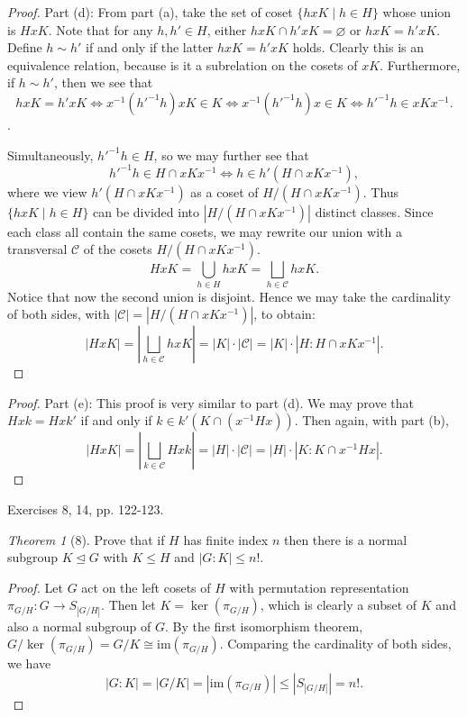 \documentclass[12pt]{article}
\theoremstyle{remark}
\theoremstyle{named}
\newtheorem*{theorem}{Theorem}
\newcommand{\normal}{\trianglelefteq}
\begin{document}
\begin{proof}
    Part (d): From part (a), take the set of coset \(\{hxK \mid h \in H\}\) whose union is \(HxK\). Note that for any \(h, h' \in H\), either \(hxK \cap h'xK = \varnothing\) or \(hxK = h'xK\). Define \(h \sim h'\) if and only if the latter \(hxK = h'xK\) holds. 
    Clearly this is an equivalence relation, because is it a subrelation on the cosets of \(xK\). Furthermore, if \(h \sim h'\), then we see that \[hxK = h'xK \iff x^{-1}(h'^{-1}h)x K \in K \iff x^{-1}(h'^{-1}h)x \in K \iff h'^{-1}h \in xKx^{-1}.\].

    Simultaneously, \(h'^{-1}h \in H\), so we may further see that \[h'^{-1}h \in H \cap xKx^{-1} \iff h \in h'(H \cap xKx^{-1}),\]
    where we view \(h'(H \cap xKx^{-1})\) as a coset of \(H / (H \cap xKx^{-1})\). Thus \(\{hxK \mid h \in H\}\) can be divided into \(|H / (H \cap xKx^{-1})|\) distinct classes. Since each class all contain the same cosets, we may rewrite our union with a transversal \(\mathcal C\) of the cosets \(H / (H \cap xKx^{-1})\).
    \[HxK = \bigcup_{h \in H} hxK = \bigsqcup_{h \in \mathcal C} hxK.\]
    Notice that now the second union is disjoint. Hence we may take the cardinality of both sides, with \(|\mathcal C| = |H / (H \cap xKx^{-1})|\), to obtain:
    \[|HxK| = \left|\bigsqcup_{h \in \mathcal C} hxK\right| = |K| \cdot |\mathcal C| = |K| \cdot |H : H \cap xKx^{-1}|.\]
\end{proof}

\begin{proof}
    Part (e): This proof is very similar to part (d). We may prove that \(Hxk = Hxk'\) if and only if \(k \in k'(K \cap (x^{-1} H x))\). Then again, with part (b),
    \[|HxK| = \left|\bigsqcup_{k \in \mathcal C} Hxk\right| = |H| \cdot |\mathcal C| = |H| \cdot |K : K \cap x^{-1}Hx|.\]
\end{proof}

Exercises 8, 14, pp. 122-123.

\begin{theorem}[8]
    Prove that if \(H\) has finite index \(n\) then there is a normal subgroup \(K \normal G\) with \(K \le H\) and \(|G : K| \le n!\). 
\end{theorem}

\begin{proof}
    Let \(G\) act on the left cosets of \(H\) with permutation representation \(\pi_{G / H} : G \to S_{|G/H|}\). Then let \(K = \ker (\pi_{G/H})\), which is clearly a subset of \(K\) and also a normal subgroup of \(G\). By the first isomorphism theorem, \(G / \ker(\pi_{G/H}) = G / K \cong \text{im}(\pi_{G/H})\). Comparing the cardinality of both sides, we have \
    \[|G : K| = |G / K| = |\text{im}(\pi_{G / H})| \le |S_{|G / H|}| = n!.\]
\end{proof}
\end{document}
